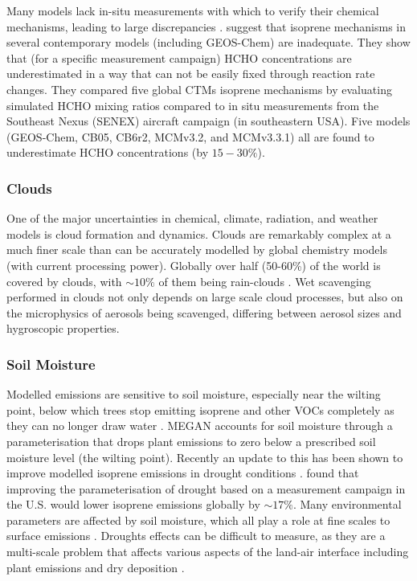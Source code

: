       Many models lack in-situ measurements with which to verify their chemical mechanisms, leading to large discrepancies \parencite{Marvin2017}.
      \textcite{Marvin2017} suggest that isoprene mechanisms in several contemporary models (including GEOS-Chem) are inadequate. 
      They show that (for a specific measurement campaign) HCHO concentrations are underestimated in a way that can not be easily fixed through reaction rate changes.
      They compared five global CTMs isoprene mechanisms by evaluating simulated HCHO mixing ratios compared to in situ measurements from the Southeast Nexus (SENEX) aircraft campaign (in southeastern USA).
      Five models (GEOS-Chem, CB05, CB6r2, MCMv3.2, and MCMv3.3.1) all are found to underestimate HCHO concentrations (by $15 - 30\%$).
      
    
    \subsubsection{Clouds}
      \label{LR:Models:Uncert:Clouds}
      One of the major uncertainties in chemical, climate, radiation, and weather models is cloud formation and dynamics.
      Clouds are remarkably complex at a much finer scale than can be accurately modelled by global chemistry models (with current processing power).
      Globally over half (50-60\%) of the world is covered by clouds, with $\sim10\%$ of them being rain-clouds \parencite{Kanakidou2005}.
      Wet scavenging performed in clouds not only depends on large scale cloud processes, but also on the microphysics of aerosols being scavenged, differing between aerosol sizes and hygroscopic properties.
      
      
    
    \subsubsection{Soil Moisture}
      \label{LR:Models:Uncert:SoilMoisture}
      Modelled emissions are sensitive to soil moisture, especially near the wilting point, below which trees stop emitting isoprene and other VOCs completely as they can no longer draw water \parencite{Bauwens2016}.
      MEGAN accounts for soil moisture through a parameterisation that drops plant emissions to zero below a prescribed soil moisture level (the wilting point).
      Recently an update to this has been shown to improve modelled isoprene emissions in drought conditions \parencite{Jiang2018}.
      \textcite{Jiang2018} found that improving the parameterisation of drought based on a measurement campaign in the U.S. would lower isoprene emissions globally by $\sim17\%$.
      Many environmental parameters are affected by soil moisture, which all play a role at fine scales to surface emissions \parencite{Rowntree1983,Chen2001}.
      Droughts effects can be difficult to measure, as they are a multi-scale problem that affects various aspects of the land-air interface including plant emissions and dry deposition \parencite{Wang2017}.
      

